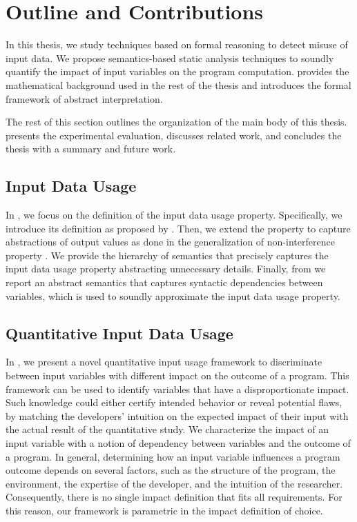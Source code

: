 \section{Outline and Contributions}

In this thesis, we study techniques based on formal reasoning to detect misuse of input data.
We propose semantics-based static analysis techniques to soundly quantify the impact of input variables on the program computation.
 provides the mathematical background used in the rest of the thesis and introduces the formal framework of abstract interpretation.

The rest of this section outlines the organization of the main body of this thesis.
 presents the experimental evaluation,  discusses related work, and  concludes the thesis with a summary and future work.

\subsection{Input Data Usage}

In , we focus on the definition of the input data usage property. Specifically, we introduce its definition as proposed by .
Then, we extend the property to capture abstractions of output values as done in the generalization of non-interference property .
We provide the hierarchy of semantics that precisely captures the input data usage property abstracting unnecessary details.
Finally, from \textcite{Urban2018} we report an abstract semantics that captures syntactic dependencies between variables, which is used to soundly approximate the input data usage property.

\subsection{Quantitative Input Data Usage}

In , we present a novel quantitative input usage framework to discriminate between input variables with different impact on the outcome of a program.
This framework can be used to identify variables that have a disproportionate impact.
Such knowledge could either certify intended behavior or reveal potential flaws, by matching the developers' intuition on the expected impact of their input with the actual result of the quantitative study.
We characterize the impact of an input variable with a notion of dependency between variables and the outcome of a program.
In general, determining how an input variable influences a program outcome depends on several factors, such as the structure of the program, the environment, the expertise of the developer, and the intuition of the researcher.
Consequently, there is no single impact definition that fits all requirements. For this reason, our framework is parametric in the impact definition of choice.


